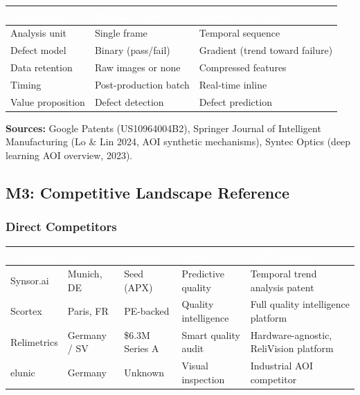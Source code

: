 \documentclass[11pt,letterpaper]{article}
\newcommand{\tableheader}[1]{\textbf{\sffamily\textcolor{white}{#1}}}
\begin{document}
\begin{center}
\begin{tabularx}{\textwidth}{L{3.5cm}XX}
\toprule
{}
\tableheader{Dimension} & \tableheader{Standard AOI} & \tableheader{Synsor Approach} \\
\midrule
Analysis unit & Single frame & Temporal sequence \\
Defect model & Binary (pass/fail) & Gradient (trend toward failure) \\
Data retention & Raw images or none & Compressed features \\
Timing & Post-production batch & Real-time inline \\
Value proposition & Defect detection & Defect prediction \\
\bottomrule
\end{tabularx}
\end{center}

\textbf{Sources:} Google Patents (US10964004B2), Springer Journal of Intelligent Manufacturing (Lo \& Lin 2024, AOI synthetic mechanisms), Syntec Optics (deep learning AOI overview, 2023).

\subsection{M3: Competitive Landscape Reference}

\subsubsection{Direct Competitors}

\begin{center}
\begin{tabularx}{\textwidth}{L{2.2cm}L{2cm}L{2.2cm}L{2cm}X}
\toprule
{}
\tableheader{Company} & \tableheader{HQ} & \tableheader{Funding} & \tableheader{Focus} & \tableheader{Differentiator} \\
\midrule
Synsor.ai & Munich, DE & Seed (APX) & Predictive quality & Temporal trend analysis patent \\
Scortex & Paris, FR & PE-backed & Quality intelligence & Full quality intelligence platform \\
Relimetrics & Germany / SV & \$6.3M Series A & Smart quality audit & Hardware-agnostic, ReliVision platform \\
elunic & Germany & Unknown & Visual inspection & Industrial AOI competitor \\
\bottomrule
\end{tabularx}
\end{center}
\end{document}
